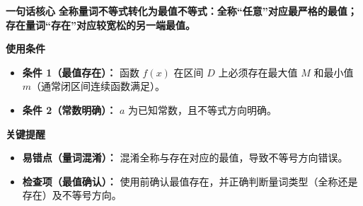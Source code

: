 \begin{summarybox}
	\textbf{\textcolor{CSummary}{一句话核心}}
	\textbf{全称量词不等式转化为最值不等式：全称“任意”对应最严格的最值；存在量词“存在”对应较宽松的另一端最值。}

	\medskip
	\textbf{\textcolor{CSummary}{使用条件}}
	\begin{itemize}[leftmargin=*, itemsep=0.5em, topsep=0.4em]
		\item \textbf{条件 1（最值存在）：} 函数 $f(x)$ 在区间 $D$ 上必须存在最大值 $M$ 和最小值 $m$（通常闭区间连续函数满足）。
		\item \textbf{条件 2（常数明确）：} $a$ 为已知常数，且不等式方向明确。
	\end{itemize}

	\medskip
	\textbf{\textcolor{CSummary}{关键提醒}}
	\begin{itemize}[leftmargin=*, itemsep=0.5em, topsep=0.4em]
		\item \textbf{易错点（量词混淆）：} 混淆全称与存在对应的最值，导致不等号方向错误。
		\item \textbf{检查项（最值确认）：} 使用前确认最值存在，并正确判断量词类型（全称还是存在）及不等号方向。
	\end{itemize}

\end{summarybox}
